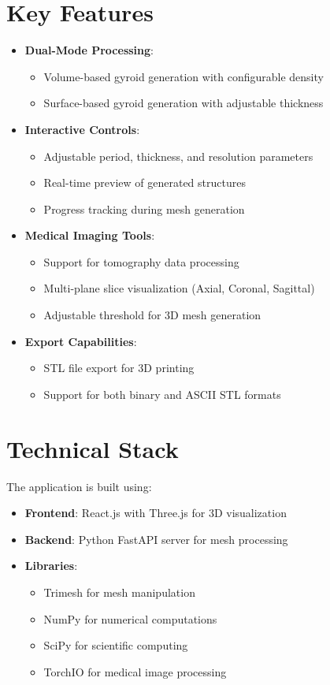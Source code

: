 \section{Key Features}
\begin{itemize}
    \item \textbf{Dual-Mode Processing}:
        \begin{itemize}
            \item Volume-based gyroid generation with configurable density
            \item Surface-based gyroid generation with adjustable thickness
        \end{itemize}
    \item \textbf{Interactive Controls}:
        \begin{itemize}
            \item Adjustable period, thickness, and resolution parameters
            \item Real-time preview of generated structures
            \item Progress tracking during mesh generation
        \end{itemize}
    \item \textbf{Medical Imaging Tools}:
        \begin{itemize}
            \item Support for tomography data processing
            \item Multi-plane slice visualization (Axial, Coronal, Sagittal)
            \item Adjustable threshold for 3D mesh generation
        \end{itemize}
    \item \textbf{Export Capabilities}:
        \begin{itemize}
            \item STL file export for 3D printing
            \item Support for both binary and ASCII STL formats
        \end{itemize}
\end{itemize}

\section{Technical Stack}
The application is built using:
\begin{itemize}
    \item \textbf{Frontend}: React.js with Three.js for 3D visualization
    \item \textbf{Backend}: Python FastAPI server for mesh processing
    \item \textbf{Libraries}:
        \begin{itemize}
            \item Trimesh for mesh manipulation
            \item NumPy for numerical computations
            \item SciPy for scientific computing
            \item TorchIO for medical image processing
        \end{itemize}
\end{itemize}

